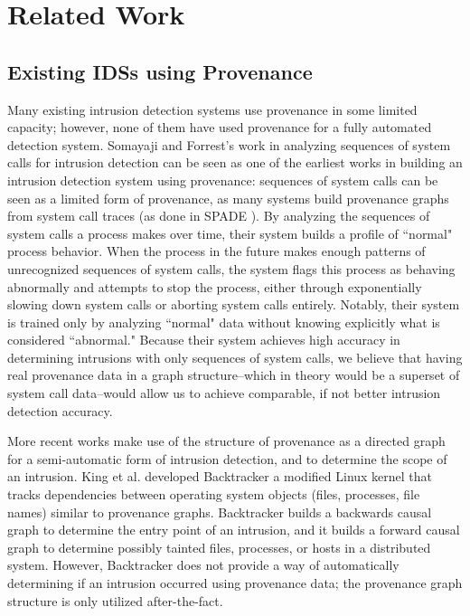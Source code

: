 \documentclass[10pt,twocolumn]{article}
\begin{document}
%

\section{Related Work}

\subsection{Existing IDSs using Provenance}

Many existing intrusion detection systems use provenance in some limited capacity; however, none of them
have used provenance for a fully automated detection system. 
Somayaji and Forrest's work in analyzing sequences of system calls for intrusion detection \cite{somayaji, somayaji-recent} can
be seen as one of the earliest works in building an intrusion detection system using provenance: sequences of
system calls can be seen as a limited form of provenance, as many systems build provenance graphs from
system call traces (as done in SPADE \cite{spade}). By analyzing the sequences
of system calls a process makes over time, their system builds a profile of ``normal" process behavior. When
the process in the future makes enough patterns of unrecognized sequences of system calls, the system flags
this process as behaving abnormally and attempts to stop the process, either through exponentially slowing down
system calls or aborting system calls entirely. Notably, their system is trained only by analyzing ``normal" data
without knowing explicitly what is considered ``abnormal." Because their system achieves high
accuracy in determining intrusions with only sequences of system calls, we believe that having real provenance
data in a graph structure--which in theory would be a superset of system call data--would allow us
to achieve comparable, if not better intrusion detection accuracy.

More recent works make use of the structure of provenance as a directed graph for a semi-automatic form
of intrusion detection, and to determine the scope of an intrusion. King et al. developed Backtracker \cite{backtracker}
 a modified
Linux kernel that tracks dependencies between operating system objects (files, processes, file names) similar
to provenance graphs. Backtracker builds a backwards causal graph to determine the entry point of an intrusion,
and it builds a forward causal graph to determine possibly tainted files, processes, or hosts in a distributed
system. However, Backtracker does not provide a way of automatically determining if an intrusion occurred
using provenance data; the provenance graph structure is only utilized after-the-fact.
\end{document}
